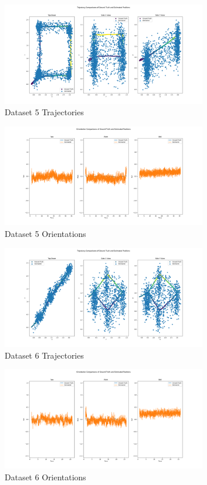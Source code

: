 \documentclass{article}
\begin{document}
\begin{figure}[H]
    \centering
    \includegraphics[width=0.8\textwidth]{./imgs/task1/studentdata5_positions.png}
    \caption{Dataset 5 Trajectories}
\end{figure}

\begin{figure}[H]
    \centering
    \includegraphics[width=0.8\textwidth]{./imgs/task1/studentdata5_orientations.png}
    \caption{Dataset 5 Orientations}
\end{figure}

\begin{figure}[H]
    \centering
    \includegraphics[width=0.8\textwidth]{./imgs/task1/studentdata6_positions.png}
    \caption{Dataset 6 Trajectories}
\end{figure}

\begin{figure}[H]
    \centering
    \includegraphics[width=0.8\textwidth]{./imgs/task1/studentdata6_orientations.png}
    \caption{Dataset 6 Orientations}
\end{figure}
\end{document}
